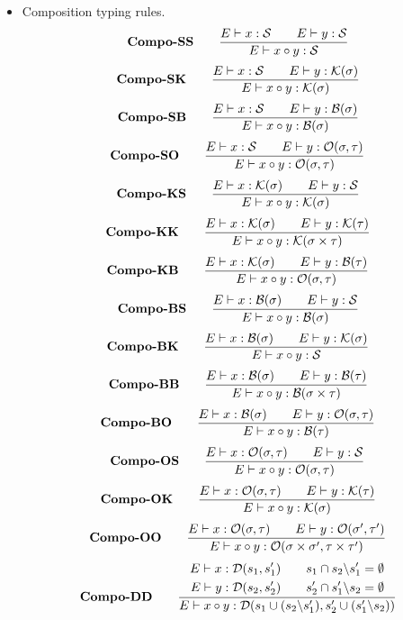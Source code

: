 \begin{itemize}
    \item Composition typing rules. 
    \[  \textbf{Compo-SS} \qquad
        \frac{E \vdash x : \mathcal{S} \qquad E \vdash y : \mathcal{S}}{E \vdash x \circ y : \mathcal{S}}
    \]
    \[  \textbf{Compo-SK} \qquad
        \frac{E \vdash x : \mathcal{S} \qquad E \vdash y : \mathcal{K}(\sigma)}{E \vdash x \circ y : \mathcal{K}(\sigma)}
    \]
    \[  \textbf{Compo-SB} \qquad
        \frac{E \vdash x : \mathcal{S} \qquad E \vdash y : \mathcal{B}(\sigma)}{E \vdash x \circ y : \mathcal{B}(\sigma)}
    \]
    \[  \textbf{Compo-SO} \qquad
        \frac{E \vdash x : \mathcal{S} \qquad E \vdash y : \mathcal{O}(\sigma, \tau)}{E \vdash x \circ y : \mathcal{O}(\sigma, \tau)}
    \]
    \[  \textbf{Compo-KS} \qquad
        \frac{E \vdash x : \mathcal{K}(\sigma) \qquad E \vdash y : \mathcal{S}}{E \vdash x \circ y : \mathcal{K}(\sigma)}
    \]
    \[  \textbf{Compo-KK} \qquad
        \frac{E \vdash x : \mathcal{K}(\sigma) \qquad E \vdash y : \mathcal{K}(\tau)}{E \vdash x \circ y : \mathcal{K}(\sigma \times \tau)}
    \]
    \[  \textbf{Compo-KB} \qquad
        \frac{E \vdash x : \mathcal{K}(\sigma) \qquad E \vdash y : \mathcal{B}(\tau)}{E \vdash x \circ y : \mathcal{O}(\sigma, \tau)}
    \]
    \[  \textbf{Compo-BS} \qquad
        \frac{E \vdash x : \mathcal{B}(\sigma) \qquad E \vdash y : \mathcal{S}}{E \vdash x \circ y : \mathcal{B}(\sigma)}
    \]
    \[  \textbf{Compo-BK} \qquad
        \frac{E \vdash x : \mathcal{B}(\sigma) \qquad E \vdash y : \mathcal{K}(\sigma)}{E \vdash x \circ y : \mathcal{S}}
    \]
    \[  \textbf{Compo-BB} \qquad
        \frac{E \vdash x : \mathcal{B}(\sigma) \qquad E \vdash y : \mathcal{B}(\tau)}{E \vdash x \circ y : \mathcal{B}(\sigma \times \tau)}
    \]
    \[  \textbf{Compo-BO} \qquad
        \frac{E \vdash x : \mathcal{B}(\sigma) \qquad E \vdash y : \mathcal{O}(\sigma, \tau)}{E \vdash x \circ y : \mathcal{B}(\tau)}
    \]
    \[  \textbf{Compo-OS} \qquad
        \frac{E \vdash x : \mathcal{O}(\sigma, \tau) \qquad E \vdash y : \mathcal{S}}{E \vdash x \circ y : \mathcal{O}(\sigma, \tau)}
    \]
    \[  \textbf{Compo-OK} \qquad
        \frac{E \vdash x : \mathcal{O}(\sigma, \tau) \qquad E \vdash y : \mathcal{K}(\tau)}{E \vdash x \circ y : \mathcal{K}(\sigma)}
    \]
    \[  \textbf{Compo-OO} \qquad
        \frac{E \vdash x : \mathcal{O}(\sigma, \tau) \qquad E \vdash y : \mathcal{O}(\sigma', \tau')}{E \vdash x \circ y : \mathcal{O}(\sigma \times \sigma', \tau \times \tau')}
    \]
    \[
        \textbf{Compo-DD} \qquad
        \frac{
            \begin{aligned}
                E \vdash x : \mathcal{D}(s_1,s_1') \\
                E \vdash y : \mathcal{D}(s_2,s_2')
            \end{aligned}
            \qquad 
            \begin{aligned}
                s_1 \cap s_2 \backslash s_1' = \emptyset \\
                s_2' \cap s_1' \backslash s_2 = \emptyset
            \end{aligned}
        }
        {E \vdash x\circ y : \mathcal{D}(s_1 \cup (s_2\backslash s_1'), s_2' \cup (s_1'\backslash s_2))}
    \]



\end{itemize}

